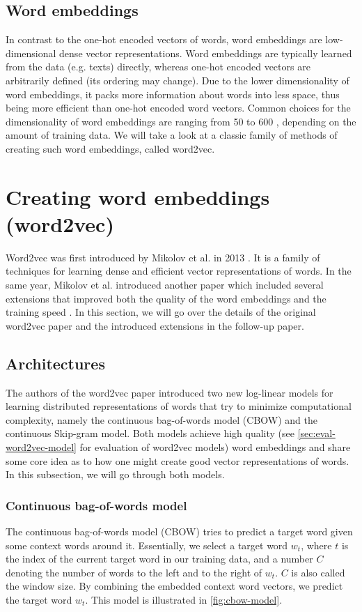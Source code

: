\subsection{Word embeddings}
In contrast to the one-hot encoded vectors of words, word embeddings are low-dimensional dense vector representations. Word embeddings are typically learned from the data (e.g. texts) directly, whereas one-hot encoded vectors are arbitrarily defined (its ordering may change). Due to the lower dimensionality of word embeddings, it packs more information about words into less space, thus being more efficient than one-hot encoded word vectors. Common choices for the dimensionality of word embeddings are ranging from 50 to 600 \cite{mikolov2013a}, depending on the amount of training data. We will take a look at a classic family of methods of creating such word embeddings, called word2vec.

\section{Creating word embeddings (word2vec)}
Word2vec was first introduced by Mikolov et al. in 2013 \cite{mikolov2013a}. It is a family of techniques for learning dense and efficient vector representations of words. In the same year, Mikolov et al. introduced another paper which included several extensions that improved both the quality of the word embeddings and the training speed \cite{mikolov2013b}. In this section, we will go over the details of the original word2vec paper and the introduced extensions in the follow-up paper.

\subsection{Architectures}
The authors of the word2vec paper introduced two new log-linear models for learning distributed representations of words that try to minimize computational complexity, namely the continuous bag-of-words model (CBOW) and the continuous Skip-gram model. Both models achieve high quality (see \cref{sec:eval-word2vec-model} for evaluation of word2vec models) word embeddings \cite{mikolov2013a} and share some core idea as to how one might create good vector representations of words. In this subsection, we will go through both models.

\subsubsection{Continuous bag-of-words model}
The continuous bag-of-words model (CBOW) tries to predict a target word given some context words around it. Essentially, we select a target word $w_t$, where $t$ is the index of the current target word in our training data, and a number $C$ denoting the number of words to the left and to the right of $w_t$. $C$ is also called the window size. By combining the embedded context word vectors, we predict the target word $w_t$. This model is illustrated in \cref{fig:cbow-model}.

